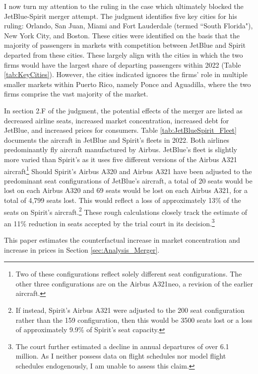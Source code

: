 \documentclass{article}
\begin{document}
	 I now turn my attention to the ruling in the case \citep{william_g_young_findings_2024} which ultimately blocked the JetBlue-Spirit merger attempt. The judgment identifies five key cities for his ruling: Orlando, San Juan, Miami and Fort Lauderdale (termed ``South Florida"), New York City, and Boston. These cities were identified on the basis that the majority of passengers in markets with competition between JetBlue and Spirit departed from these cities. These largely align with the cities in which the two firms would have the largest share of departing passengers within 2022 (Table \ref{tab:KeyCities}). However, the cities indicated ignores the firms' role in multiple smaller markets within Puerto Rico, namely Ponce and Aguadilla, where the two firms comprise the vast majority of the market. 
	
	 In section 2.F of the judgment, the potential effects of the merger are listed as decreased airline seats, increased market concentration, increased debt for JetBlue, and increased prices for consumers. Table \ref{tab:JetBlueSpirit_Fleet} documents the aircraft in JetBlue and Spirit's fleets in 2022. Both airlines predominantly fly aircraft manufactured by Airbus. JetBlue's fleet is slightly more varied than Spirit's as it uses five different versions of the Airbus A321 aircraft\footnote{Two of these configurations reflect solely different seat configurations. The other three configurations are on the Airbus A321neo, a revision of the earlier aircraft.} Should Spirit's Airbus A320 and Airbus A321 have been adjusted to the predominant seat configurations of JetBlue's aircraft, a total of 20 seats would be lost on each Airbus A320 and 69 seats would be lost on each Airbus A321, for a total of 4,799 seats lost. This would reflect a loss of approximately 13\% of the seats on Spirit's aircraft.\footnote{If instead, Spirit's Airbus A321 were adjusted to the 200 seat configuration rather than the 159 configuration, then this would be 3500 seats lost or a loss of approximately 9.9\% of Spirit's seat capacity.} These rough calculations closely track the estimate of an 11\% reduction in seats accepted by the trial court in its decision.\footnote{The court further estimated a decline in annual departures of over 6.1 million. As I neither possess data on flight schedules nor model flight schedules endogenously, I am unable to assess this claim.} 

    This paper estimates the counterfactual increase in market concentration and increase in prices in Section \ref{sec:Analysis_Merger}. 
\end{document}
